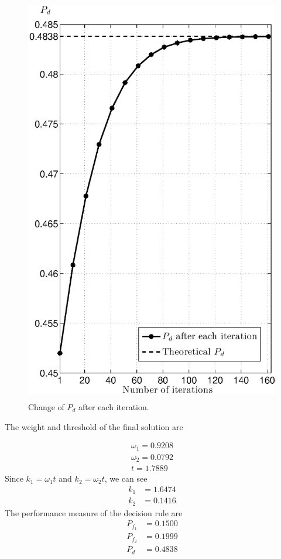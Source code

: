 \begin{figure}[H]
\centering
\includegraphics[width = 12cm,  height = 18cm]{2/152pd.eps}
\caption{Change of $P_d$ after each iteration.}
\label{fig: 2.2}
\end{figure}
\newpage

The weight and threshold of the final solution are

\[
\begin{split}
\omega_1 = 0.9208\\
\omega_2 = 0.0792\\
t = 1.7889
\end{split}
\]
Since $k_1 = \omega_1 t$ and $k_2 = \omega_2 t$, we can see
\[
\begin{split}
k_1 &= 1.6474\\
k_2 &= 0.1416
\end{split}
\]
The performance measure of the decision rule are
\[
\begin{split}
P_{f_1} &= 0.1500\\
P_{f_2} &= 0.1999\\
P_d &= 0.4838
\end{split}
\]


